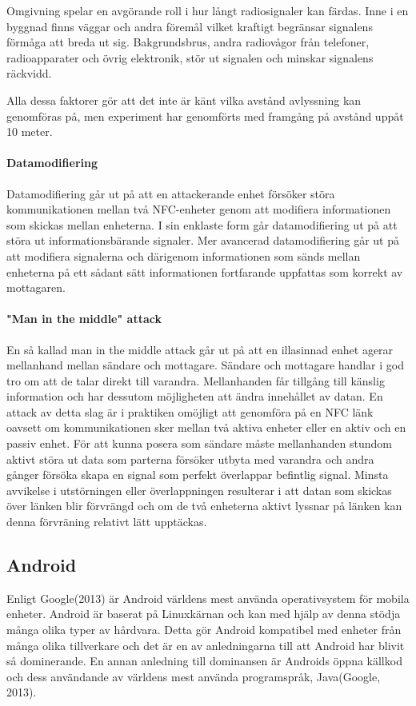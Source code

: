\documentclass[11pt]{article}
\begin{document}
Omgivning spelar en avgörande roll i hur långt radiosignaler kan färdas. Inne i en byggnad finns väggar och andra föremål vilket kraftigt begränsar signalens förmåga att breda ut sig. Bakgrundsbrus, andra radiovågor från telefoner, radioapparater och övrig elektronik, stör ut signalen och minskar signalens räckvidd.

Alla dessa faktorer gör att det inte är känt vilka avstånd avlyssning kan genomföras på, men experiment har genomförts med framgång på avstånd uppåt 10 meter. 


\paragraph{Datamodifiering}
Datamodifiering går ut på att en attackerande enhet försöker störa kommunikationen mellan två NFC-enheter genom att modifiera informationen som skickas mellan enheterna. I sin enklaste form går datamodifiering ut på att störa ut  informationsbärande signaler. Mer avancerad datamodifiering går ut på att modifiera signalerna och därigenom informationen som sänds mellan enheterna på ett sådant sätt informationen fortfarande uppfattas som korrekt av mottagaren. 

\paragraph{"Man in the middle" attack}
En så kallad man in the middle attack går ut på att en illasinnad enhet agerar mellanhand mellan sändare och mottagare. Sändare och mottagare handlar i god tro om att de talar direkt till varandra. Mellanhanden får tillgång till känslig information och har dessutom möjligheten att ändra innehållet av datan. En attack av detta slag är i praktiken omöjligt att genomföra på en NFC länk oavsett om kommunikationen sker mellan två aktiva enheter eller en aktiv och en passiv enhet. För att kunna posera som sändare måste mellanhanden stundom aktivt störa ut data som parterna försöker utbyta med varandra och andra gånger försöka skapa en signal som perfekt överlappar befintlig signal. Minsta avvikelse i utstörningen eller överlappningen resulterar i att datan som skickas över länken blir förvrängd och om de två enheterna aktivt lyssnar på länken kan denna förvräning relativt lätt upptäckas. 

\subsection{Android}
Enligt Google(2013) är Android världens mest använda operativsystem för mobila enheter. Android är baserat på Linuxkärnan och kan med hjälp av denna stödja många olika typer av hårdvara. Detta gör Android kompatibel med enheter från många olika tillverkare och det är en av anledningarna till att Android har blivit så dominerande. En annan anledning till dominansen är Androids öppna källkod och dess användande av världens mest använda programspråk, Java(Google, 2013).
\end{document}
